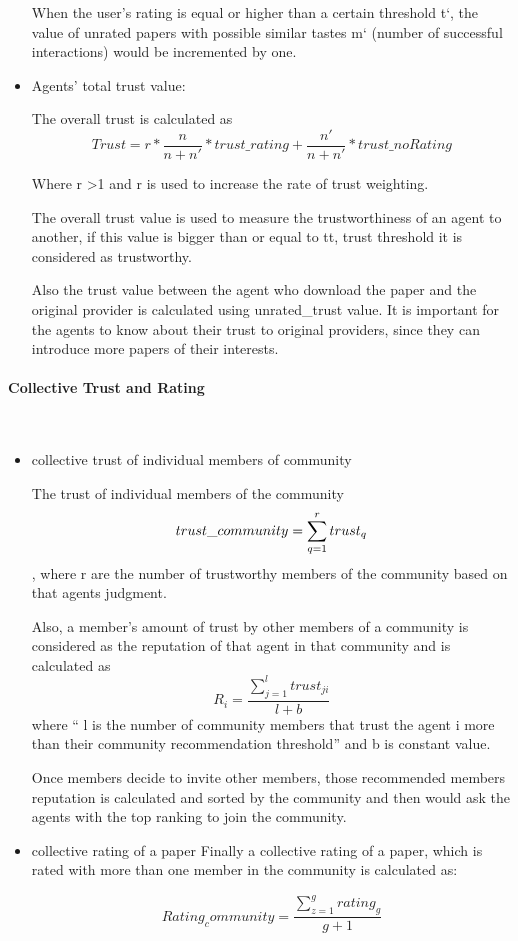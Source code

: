 \documentclass [12pt]{article} \usepackage{multicol}
\begin{document}
\begin{itemize}
	When the user’s rating is equal or higher than a certain
threshold t`, the value of unrated papers with possible similar
tastes  m` (number of successful interactions)  would be incremented
by one. 

\item Agents' total trust value:

The overall trust is calculated as 
$$Trust =  r * \frac{n}{n+n'}  * trust\_rating +  \frac{n'}{ n+n'} * trust\_noRating $$

Where r >1 and r is used to increase the rate of trust weighting. 

	The overall trust value is used to measure the trustworthiness of
an agent to another, if this value is bigger than or equal to  tt,
trust threshold it is considered as trustworthy.

	Also the trust value between the agent who download the paper and
the original provider is calculated using unrated\_trust value. It is
important for the agents to know about their trust to original
providers, since they can introduce more papers of their interests. 

\end{itemize}

\paragraph{Collective Trust and Rating}\mbox{}\\ \newline 

\begin{itemize}

\item collective trust of individual members of community


The trust of individual members of the community
 $$  trust\_community = \sum_{q= 1}^{r} {trust}_q \\$$ ,
where r are the number of trustworthy members of the community based on that agents judgment.


Also, a member’s amount of trust by other members of a community
is considered as the reputation of that agent in that community and
is calculated as  $$ R_i =  \frac{\sum_{j= 1}^{l} {trust}_{ji}} { l + b }  $$
where `` l is  the number of community members that trust the agent i more than their community 
recommendation threshold'' and b is constant value.


Once members decide to invite other members, those recommended
members reputation is calculated and sorted by the community and then
would ask the agents with the top ranking to join the community. 

\item collective rating of a paper
Finally a collective rating of a paper, which is rated with more than one member in the community is calculated as: 

$$ Rating_community  = \frac{ \sum_{z= 1}^{g} {rating}_g }{g+1}  $$


\end{itemize}
\end{document}
